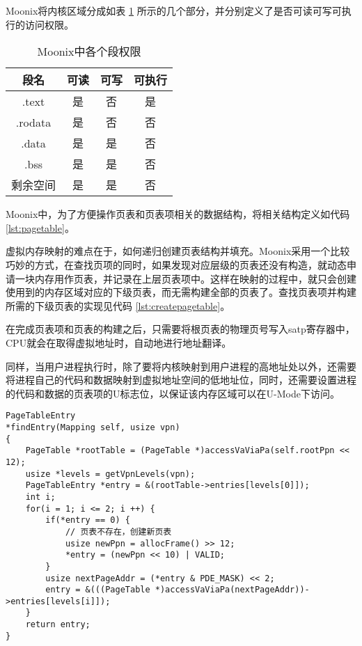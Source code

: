 Moonix将内核区域分成如表 \ref{tab:sectionprivilege} 所示的几个部分，并分别定义了是否可读可写可执行的访问权限。

\begin{table}[h]
	\centering
	\caption{Moonix中各个段权限}
	\label{tab:sectionprivilege}
	\begin{tabular}{cccc}
		\hline
		段名      & 可读 & 可写 & 可执行 \\ \hline
		.text   & 是  & 否  & 是   \\
		.rodata & 是  & 否  & 否   \\
		.data   & 是  & 是  & 否   \\
		.bss    & 是  & 是  & 否   \\
		剩余空间    & 是  & 是  & 否   \\ \hline
	\end{tabular}
\end{table}

Moonix中，为了方便操作页表和页表项相关的数据结构，将相关结构定义如代码 \ref{lst:pagetable}。

虚拟内存映射的难点在于，如何递归创建页表结构并填充。Moonix采用一个比较巧妙的方式，在查找页项的同时，如果发现对应层级的页表还没有构造，就动态申请一块内存用作页表，并记录在上层页表项中。这样在映射的过程中，就只会创建使用到的内存区域对应的下级页表，而无需构建全部的页表了。查找页表项并构建所需的下级页表的实现见代码 \ref{lst:createpagetable}。

在完成页表项和页表的构建之后，只需要将根页表的物理页号写入satp寄存器中，CPU就会在取得虚拟地址时，自动地进行地址翻译。

同样，当用户进程执行时，除了要将内核映射到用户进程的高地址处以外，还需要将进程自己的代码和数据映射到虚拟地址空间的低地址位，同时，还需要设置进程的代码和数据的页表项的U标志位，以保证该内存区域可以在U-Mode下访问。

\begin{minipage}[c]{0.95\textwidth}
\begin{lstlisting}[language={moonix}, caption={查找页表项}, label={lst:createpagetable}]
PageTableEntry
*findEntry(Mapping self, usize vpn)
{
	PageTable *rootTable = (PageTable *)accessVaViaPa(self.rootPpn << 12);
	usize *levels = getVpnLevels(vpn);
	PageTableEntry *entry = &(rootTable->entries[levels[0]]);
	int i;
	for(i = 1; i <= 2; i ++) {
		if(*entry == 0) {
			// 页表不存在，创建新页表
			usize newPpn = allocFrame() >> 12;
			*entry = (newPpn << 10) | VALID;
		}
		usize nextPageAddr = (*entry & PDE_MASK) << 2;
		entry = &(((PageTable *)accessVaViaPa(nextPageAddr))->entries[levels[i]]);
	}
	return entry;
}
\end{lstlisting}
\end{minipage}

